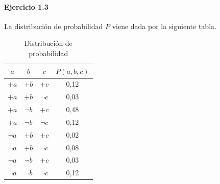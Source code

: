 \documentclass[12pt,a4paper]{article}
\begin{document}
\paragraph{Ejercicio 1.3}
La distribución de probabilidad $P$ viene dada por la siguiente tabla.
\begin{table}[h!]
    \centering
    \begin{tabular}{|ccc|c|}
    \hline
     $a$ & $b$ & $c$ & $P(a,b,c)$ \\
    \hline
     $+a$ & $+b$ & $+c$ & 0,12 \\
    \hline 
    $+a$ & $+b$ & $ \neg c$ & 0,03 \\
    \hline 
    $+a$ & $ \neg b$ & $+c$ & 0,48 \\
    \hline 
    $+a$ & $ \neg b$ & $ \neg c$ & 0,12 \\
    \hline
    $ \neg a$ & $+b$ & $+c$ & 0,02 \\
    \hline
    $ \neg a$ & $+b$ & $ \neg c$ & 0,08 \\
    \hline 
    $ \neg a$ & $ \neg b$ & $+c$ & 0,03 \\
    \hline
    $ \neg a$ & $ \neg b$ & $ \neg c$ & 0,12 \\
    \hline 
    \end{tabular}
    \caption{Distribución de probabilidad}
    \label{tab:my_label}
\end{table}
\end{document}
